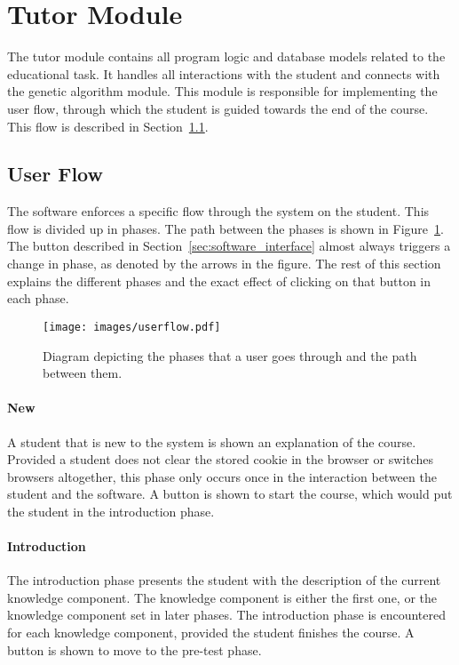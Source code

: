\section{Tutor Module}
\label{sec:software_tutor_module}
The tutor module contains all program logic and database models related to the
educational task. It handles all interactions with the student and connects
with the genetic algorithm module. This module is responsible for implementing
the user flow, through which the student is guided towards the end of the
course. This flow is described in Section~\ref{sec:software_user_flow}.
\subsection{User Flow}
\label{sec:software_user_flow}
The software enforces a specific flow through the system on the student. This
flow is divided up in phases. The path between the phases is shown in
Figure~\ref{fig:userflow}. The button described in
Section~\ref{sec:software_interface} almost always triggers a change in phase,
as denoted by the arrows in the figure. The rest of this section explains the
different phases and the exact effect of clicking on that button in each phase.
\begin{figure}[ht!]
	\centering
	\texttt{[image: images/userflow.pdf]}
	\caption[User flow diagram]{Diagram depicting the phases that a user goes
	through and the path between them.}
	\label{fig:userflow}
\end{figure}
\paragraph{New} A student that is new to the system is shown an explanation of
the course. Provided a student does not clear the stored cookie in the browser
or switches browsers altogether, this phase only occurs once in the interaction
between the student and the software. A button is shown to start the course,
which would put the student in the introduction phase.
\paragraph{Introduction} The introduction phase presents the student with the
description of the current knowledge component. The knowledge component is
either the first one, or the knowledge component set in later phases. The
introduction phase is encountered for each knowledge component, provided the
student finishes the course. A button is shown to move to the pre-test phase.
